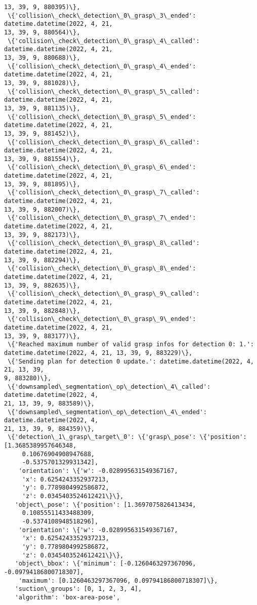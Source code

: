 \documentclass[11pt]{article}
\begin{document}
\begin{tcolorbox}[breakable, size=fbox, boxrule=.5pt, pad at break*=1mm, opacityfill=0]
\begin{Verbatim}[commandchars=\\\{\}]
13, 39, 9, 880395)\},
 \{'collision\_check\_detection\_0\_grasp\_3\_ended': datetime.datetime(2022, 4, 21,
13, 39, 9, 880564)\},
 \{'collision\_check\_detection\_0\_grasp\_4\_called': datetime.datetime(2022, 4, 21,
13, 39, 9, 880688)\},
 \{'collision\_check\_detection\_0\_grasp\_4\_ended': datetime.datetime(2022, 4, 21,
13, 39, 9, 881028)\},
 \{'collision\_check\_detection\_0\_grasp\_5\_called': datetime.datetime(2022, 4, 21,
13, 39, 9, 881135)\},
 \{'collision\_check\_detection\_0\_grasp\_5\_ended': datetime.datetime(2022, 4, 21,
13, 39, 9, 881452)\},
 \{'collision\_check\_detection\_0\_grasp\_6\_called': datetime.datetime(2022, 4, 21,
13, 39, 9, 881554)\},
 \{'collision\_check\_detection\_0\_grasp\_6\_ended': datetime.datetime(2022, 4, 21,
13, 39, 9, 881895)\},
 \{'collision\_check\_detection\_0\_grasp\_7\_called': datetime.datetime(2022, 4, 21,
13, 39, 9, 882007)\},
 \{'collision\_check\_detection\_0\_grasp\_7\_ended': datetime.datetime(2022, 4, 21,
13, 39, 9, 882173)\},
 \{'collision\_check\_detection\_0\_grasp\_8\_called': datetime.datetime(2022, 4, 21,
13, 39, 9, 882294)\},
 \{'collision\_check\_detection\_0\_grasp\_8\_ended': datetime.datetime(2022, 4, 21,
13, 39, 9, 882635)\},
 \{'collision\_check\_detection\_0\_grasp\_9\_called': datetime.datetime(2022, 4, 21,
13, 39, 9, 882848)\},
 \{'collision\_check\_detection\_0\_grasp\_9\_ended': datetime.datetime(2022, 4, 21,
13, 39, 9, 883177)\},
 \{'Reached maximum number of valid grasp infos for detection 0: 1.':
datetime.datetime(2022, 4, 21, 13, 39, 9, 883229)\},
 \{'Sending plan for detection 0 update.': datetime.datetime(2022, 4, 21, 13, 39,
9, 883280)\},
 \{'downsampled\_segmentation\_op\_detection\_4\_called': datetime.datetime(2022, 4,
21, 13, 39, 9, 883589)\},
 \{'downsampled\_segmentation\_op\_detection\_4\_ended': datetime.datetime(2022, 4,
21, 13, 39, 9, 884359)\},
 \{'detection\_1\_grasp\_target\_0': \{'grasp\_pose': \{'position': [1.3685389957646348,
     0.10676904908947688,
     -0.5375701329931342],
    'orientation': \{'w': -0.028995631549367167,
     'x': 0.6254243352937213,
     'y': 0.7789804992586872,
     'z': 0.0345403524612421\}\},
   'object\_pose': \{'position': [1.3697075826413434,
     0.10855511433488309,
     -0.5374108948518296],
    'orientation': \{'w': -0.028995631549367167,
     'x': 0.6254243352937213,
     'y': 0.7789804992586872,
     'z': 0.0345403524612421\}\},
   'object\_bbox': \{'minimum': [-0.1260463297367096, -0.09794186800718307],
    'maximum': [0.1260463297367096, 0.09794186800718307]\},
   'suction\_groups': [0, 1, 2, 3, 4],
   'algorithm': 'box-area-pose',

\end{Verbatim}
\end{tcolorbox}
\end{document}
